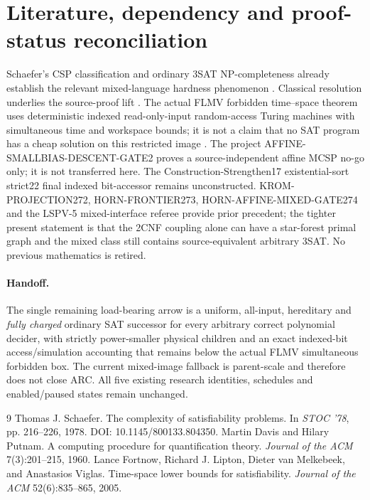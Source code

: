 \documentclass[11pt]{article}
\begin{document}
\section{Literature, dependency and proof-status reconciliation}
Schaefer's CSP classification and ordinary 3SAT NP-completeness already establish the relevant mixed-language hardness phenomenon \cite{Schaefer1978}. Classical resolution underlies the source-proof lift \cite{DavisPutnam1960}. The actual FLMV forbidden time--space theorem uses deterministic indexed read-only-input random-access Turing machines with simultaneous time and workspace bounds; it is not a claim that no SAT program has a cheap solution on this restricted image \cite{FLMV2005}. The project AFFINE-SMALLBIAS-DESCENT-GATE2 proves a source-independent affine MCSP no-go only; it is not transferred here. The Construction-Strengthen17 existential-sort strict22 final indexed bit-accessor remains unconstructed. KROM-PROJECTION272, HORN-FRONTIER273, HORN-AFFINE-MIXED-GATE274 and the LSPV-5 mixed-interface referee provide prior precedent; the tighter present statement is that the 2CNF coupling alone can have a star-forest primal graph and the mixed class still contains source-equivalent arbitrary 3SAT. No previous mathematics is retired.

\paragraph{Handoff.} The single remaining load-bearing arrow is a uniform, all-input, hereditary and \emph{fully charged} ordinary SAT successor for every arbitrary correct polynomial decider, with strictly power-smaller physical children and an exact indexed-bit access/simulation accounting that remains below the actual FLMV simultaneous forbidden box. The current mixed-image fallback is parent-scale and therefore does not close ARC. All five existing research identities, schedules and enabled/paused states remain unchanged.

\begin{thebibliography}{9}
 Thomas J. Schaefer. The complexity of satisfiability problems. In \emph{STOC '78}, pp. 216--226, 1978. DOI: 10.1145/800133.804350.
 Martin Davis and Hilary Putnam. A computing procedure for quantification theory. \emph{Journal of the ACM} 7(3):201--215, 1960.
 Lance Fortnow, Richard J. Lipton, Dieter van Melkebeek, and Anastasios Viglas. Time-space lower bounds for satisfiability. \emph{Journal of the ACM} 52(6):835--865, 2005.
\end{thebibliography}
\end{document}
